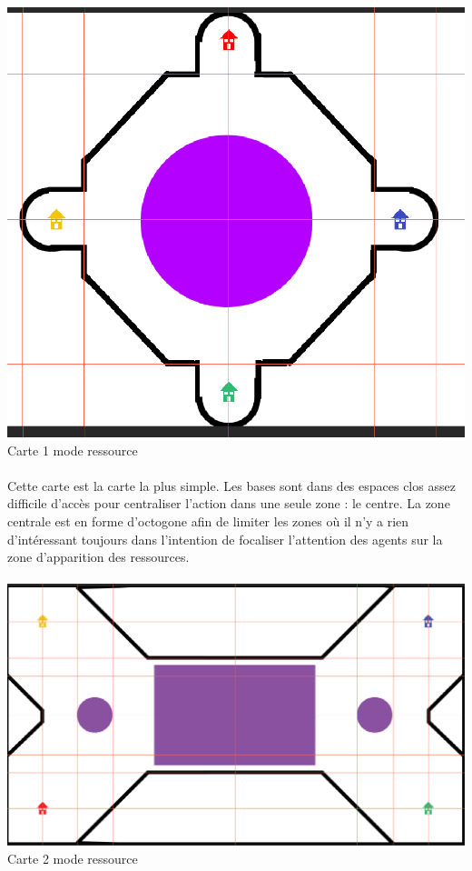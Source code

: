 \documentclass{report}
\begin{document}
\paragraph{}
\begin{center}
\includegraphics[scale=0.2]{DATA/carte+.png}
 {Carte 1 mode ressource}
\end{center}
\paragraph{}

Cette carte est la carte la plus simple. Les bases sont dans des espaces clos assez difficile d’accès pour centraliser l’action dans une seule zone : le centre. La zone centrale est en forme d’octogone afin de limiter les zones où il n’y a rien d’intéressant toujours dans l’intention de focaliser l’attention des agents sur la zone d’apparition des ressources.
\newpage
\paragraph{}
\begin{center}
\includegraphics[scale=0.2]{DATA/carteX.png}
 {Carte 2 mode ressource}
\end{center}
\end{document}
